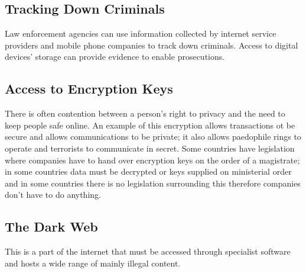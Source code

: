 \documentclass[a4paper,11pt, twocolumn]{article}
\begin{document}
\subsection{Tracking Down Criminals}
Law enforcement agencies can use information collected by internet service providers and mobile phone companies to track down criminals. Access to digital devices' storage can provide evidence to enable prosecutions.
\subsection{Access to Encryption Keys}
There is often contention between a person's right to privacy and the need to keep people safe online. An example of this encryption allows transactions ot be secure and allows communications to be private; it also allows paedophile rings to operate and terrorists to communicate in secret. Some countries have legislation where companies have to hand over encryption keys on the order of a magistrate; in some countries data must be decrypted or keys supplied on ministerial order and in some countries there is no legislation surrounding this therefore companies don't have to do anything.
\subsection{The Dark Web}
This is a part of the internet that must be accessed through specialist software and hosts a wide range of mainly illegal content.
\end{document}
